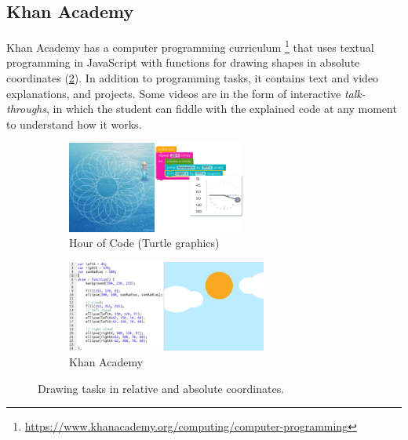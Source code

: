 
\subsection{Khan Academy}
\label{sec:khan-academy}
Khan Academy has a computer programming curriculum%
\footnote{\url{https://www.khanacademy.org/computing/computer-programming}}
that uses textual programming in JavaScript with functions for drawing shapes
in absolute coordinates
(\cref{fig:ka}).
In addition to programming tasks, it contains text and video explanations, and
projects. Some videos are in the form of interactive \emph{talk-throughs},
in which the student can fiddle with the explained code at any moment to understand
how it works.



\begin{figure}[htb]
\centering

\begin{subfigure}[t]{0.48\textwidth}
\centering
\includegraphics[height=30mm]{img/hoc-turtle2}
\caption{Hour of Code (Turtle graphics)}
\label{fig:turtle}
\end{subfigure}%
\begin{subfigure}[t]{0.52\textwidth}
\centering
\includegraphics[height=30mm]{img/khan-academy}
\caption{Khan Academy}
\label{fig:ka}
\end{subfigure}
\caption{Drawing tasks in relative and absolute coordinates.}
\label{fig:hrm-ka}
\end{figure}






